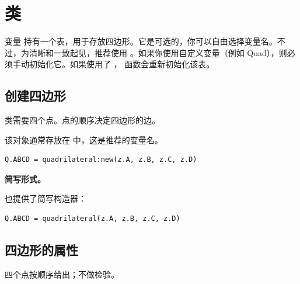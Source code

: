 \newpage
\section{ 类}

\vspace{1em}
变量  持有一个表，用于存放四边形。它是可选的，你可以自由选择变量名。不过，为清晰和一致起见，推荐使用 。如果你使用自定义变量（例如 Quad），则必须手动初始化它。如果使用了 ， 函数会重新初始化该表。


\subsection{创建四边形}
\label{sub:creating_a_quadrilateral}
 类需要四个点。点的顺序决定四边形的边。

\medskip
该对象通常存放在  中，这是推荐的变量名。

\begin{mybox}
\begin{verbatim}
Q.ABCD = quadrilateral:new(z.A, z.B, z.C, z.D)
\end{verbatim}
\end{mybox}

\textbf{简写形式。}

也提供了简写构造器：

\begin{mybox}
\begin{verbatim}
Q.ABCD = quadrilateral(z.A, z.B, z.C, z.D)
\end{verbatim}
\end{mybox}

\subsection{四边形的属性}
四个点按顺序给出；不做检验。

\begin{center}
\end{center}



